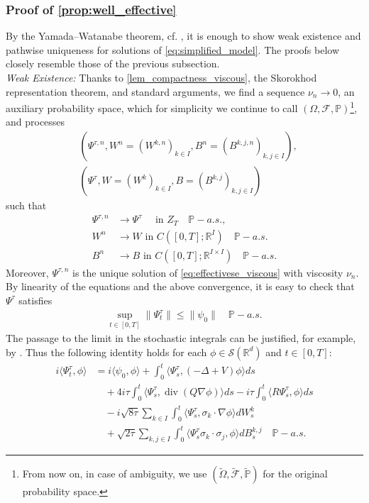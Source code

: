 \documentclass[a4paper,10pt]{amsart}
\newcommand{\R}{\mathbb{R}}
\theoremstyle{remark}
\numberwithin{equation}{section}
\begin{document}
\subsubsection{Proof of \cref{prop:well_effective}}\label{subsec:well_spde}
By the Yamada--Watanabe theorem, cf. \cite{kurtzYW}, it is enough to show
weak existence and pathwise uniqueness for solutions of
\eqref{eq:simplified_model}. The proofs below closely resemble those of the
previous subsection.\\
\emph{Weak Existence: }
Thanks to \cref{lem_compactness_viscous}, the Skorokhod representation theorem, and standard arguments, we find a sequence
$\nu_n\rightarrow0$,
an auxiliary probability space, which for simplicity we continue to call
$(\Omega,\mathcal{F},\mathbb{P})$\footnote{From now on, in case of ambiguity,
we use $(\tilde{\Omega},\tilde{\mathcal{F}},\tilde{\mathbb{P}})$ for the
original probability space.}, and processes
\begin{align*}
&(\Psi^{\tau,n},W^n=(W^{k,n})_{k\in I},
B^n=(B^{k,j,n})_{k,j\in I}),\\
&(\Psi^{\tau},W=(W^{k})_{k\in I},
B=(B^{k,j})_{k,j\in I})
\end{align*}
such that
\begin{align*}
 \Psi^{\tau,n}&\rightarrow \Psi^{\tau}\quad\text{ in }Z_T\quad \mathbb{P}-a.s.,\\
 W^n&\rightarrow W \text{ in }C([0,T];\R^I)\quad \mathbb{P}-a.s.\\
  B^n&\rightarrow B \text{ in }C([0,T];\R^{I\times I})\quad \mathbb{P}-a.s.
\end{align*}
 Moreover, $\Psi^{\tau,n}$ is the unique solution of \eqref{eq:effectivese_viscous} with viscosity $\nu_n$. By linearity of the equations and the above convergence, it is easy to check that $\Psi^\tau$ satisfies
 \begin{align*}
     \sup_{t\in [0,T]}\|\Psi^\tau_t\|\leq \|\psi_0\|\quad \mathbb{P}-a.s.
 \end{align*}
   The passage to the limit in the stochastic integrals can be justified,
   for example, by \cite[Lemma 4.3]{bagnara2025no}. Thus the following
   identity holds for each $\phi\in\mathscr{S}(\R^d)$ and $t\in[0,T]$:
	   \begin{align*}
	      i\langle \Psi^{\tau}_t,\phi\rangle
	      &=i\langle \psi_0,\phi\rangle
	      +\int_0^t \langle\Psi^{\tau}_s,(-\Delta+V)\phi\rangle ds\\
	      &\quad+4i\tau\int_0^t
	      \langle \Psi^{\tau}_s,\operatorname{div}(Q\nabla\phi)\rangle ds
	      -i\tau\int_0^t\langle R\Psi^{\tau}_s,\phi\rangle ds\\
	      &\quad-i\sqrt{8\tau}\sum_{k\in I}\int_0^t
	      \langle \Psi^{\tau}_s,\sigma_k\cdot\nabla\phi\rangle dW^k_s\\
	      &\quad+\sqrt{2\tau}\sum_{k,j\in I}\int_0^t
	      \langle \Psi^{\tau}_s\sigma_k\cdot\sigma_j,\phi\rangle dB^{k,j}_s
	      \quad \mathbb{P}-a.s.
   \end{align*}
\end{document}
